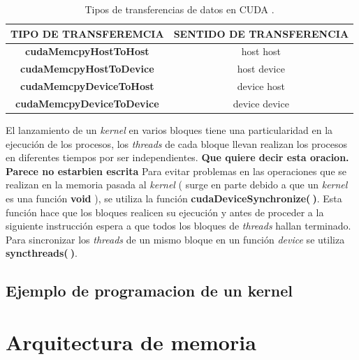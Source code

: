\begin{table}[h!]
	\centering
	\begin{tabular}{|c|c|}
		\hline
		\multicolumn{1}{|l|}{TIPO DE TRANSFEREMCIA} & \multicolumn{1}{l|}{SENTIDO DE TRANSFERENCIA} \\ \hline
		\textbf{cudaMemcpyHostToHost}               & host host                                     \\ \hline
		\textbf{cudaMemcpyHostToDevice}             & host device                                   \\ \hline
		\textbf{cudaMemcpyDeviceToHost}             & device host                                   \\ \hline
		\textbf{cudaMemcpyDeviceToDevice}           & device device                                 \\ \hline
	\end{tabular}
	\caption{Tipos de transferencias de datos en CUDA \cite{represa2016introduccion}.}
	\label{tab:cudamemcy}
\end{table}

El lanzamiento de un \textit{kernel} en varios bloques tiene una particularidad en la ejecución de los procesos, los \textit{threads} de cada bloque llevan realizan los procesos en diferentes tiempos por ser independientes. \textbf{Que quiere decir esta oracion. Parece no estarbien escrita} Para evitar problemas en las operaciones que se realizan en la memoria pasada al \textit{kernel} ( surge en parte debido a que un \textit{kernel} es una función \textbf{void} ), se utiliza la función \textbf{cudaDeviceSynchronize($\>$)}. Esta función hace que los bloques realicen su ejecución y antes de proceder a la siguiente instrucción espera a que todos los bloques de \textit{threads} hallan terminado. Para sincronizar los \textit{threads} de un mismo bloque en un función \textit{device} se utiliza \textbf{syncthreads($\>$)}.


\subsection{Ejemplo de programacion de un kernel}
















\section{Arquitectura de memoria}

